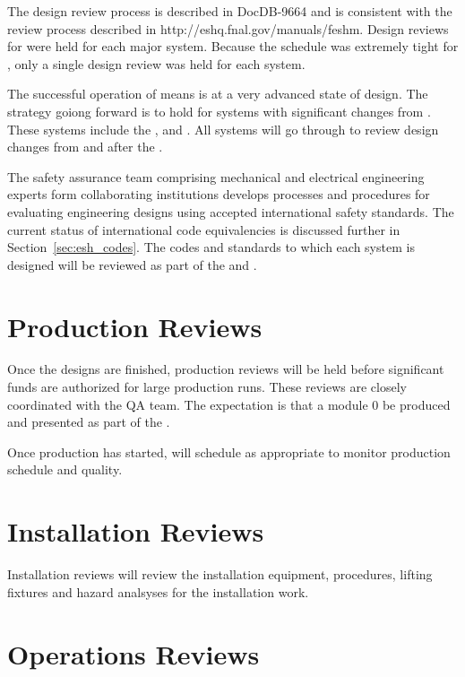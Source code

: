 The  design review process is described in DocDB-9664\cite{bib:docdb9664}
and is consistent with the \fnal review process described in
http://eshq.fnal.gov/manuals/feshm. Design reviews for  were held for each
major system. Because the schedule was extremely tight for , only a single design review
was held for each system.

The successful operation of  means  is at
a very advanced state of design. The strategy goiong forward is to
hold  for systems with significant changes from
. These systems include the ,  and
. All systems will go through  to review
design changes from  and  after the
.

The  safety assurance team comprising mechanical and electrical engineering experts form collaborating institutions develops processes and procedures for evaluating engineering designs using accepted international safety standards. 
The current status of international code equivalencies is
discussed further in Section~\ref{sec:esh_codes}. The codes and
standards to which each system is designed will be reviewed as part of
the  and .

\section{Production Reviews}

Once the designs are finished, production reviews will be held
before significant funds are authorized for large production
runs. These reviews are closely coordinated with the QA team. The
expectation is that a module 0 be produced and presented as part of the .

Once production has started,  will schedule 
as appropriate to monitor production schedule and quality.

\section{Installation Reviews}

Installation reviews will review the  installation
equipment, procedures, lifting fixtures and hazard analsyses for the
installation work.

\section{Operations Reviews}

